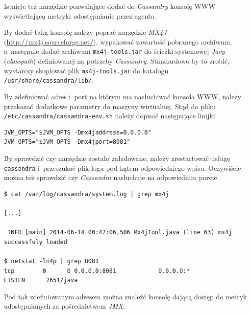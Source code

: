 \documentclass{article} %
\begin{document}
Istnieje też narzędzie pozwalające dodać do \emph{Cassandry} konsolę WWW wyświetlającą metryki udostępnianie przez agenta.

By dodać taką konsolę należy poprać narzędzie \emph{MX4J} (\url{http://mx4j.sourceforge.net/}), wypakować zawartość pobranego archiwum, a~następnie dodać archiwum \texttt{mx4j-tools.jar} do ścieżki systemowej \emph{Javy} (\emph{classpath}) definiowanej na potrzeby \emph{Cassandry}.
Standardowo by to zrobić, wystarczy skopiować plik \texttt{mx4j-tools.jar} do katalogu \texttt{/usr/share/cassandra/lib/}.

By zdefiniować adres i~port na którym ma nasłuchiwać konsola WWW, należy przekazać dodatkowe parametry do maszyny wirtualnej.
Stąd do pliku \texttt{/etc/cassandra/cassandra-env.sh} należy dopisać następujące linijki:

\begin{lstlisting}[style=bash, caption={konfiguracja \emph{mx4j} dla \emph{Cassandry}}]
JVM_OPTS="$JVM_OPTS -Dmx4jaddress=0.0.0.0"
JVM_OPTS="$JVM_OPTS -Dmx4jport=8081"
\end{lstlisting}

By sprawdzić czy narzędzie zostało załadowane, należy zrestartować usługę \texttt{cassandra} i~przeszukać plik logu pod kątem odpowiedniego wpisu.
Oczywiście można też sprawdzić czy \emph{Cassandra} nasłuchuje na odpowiednim porcie.

\pagebreak

\begin{lstlisting}[style=bash, caption={weryfikacja poprawności działania \emph{mx4j}}]
$ cat /var/log/cassandra/system.log | grep mx4j

[...]

 INFO [main] 2014-06-18 00:47:06,506 Mx4jTool.java (line 63) mx4j successfuly loaded

$ netstat -ln4p | grep 8081
tcp        0      0 0.0.0.0:8081            0.0.0.0:*               LISTEN      2651/java
\end{lstlisting}

\bigskip

Pod tak zdefiniowanym adresem można znaleźć konsolę dającą dostęp do metryk udostępnianych za pośrednictwem \emph{JMX}:
\end{document}
